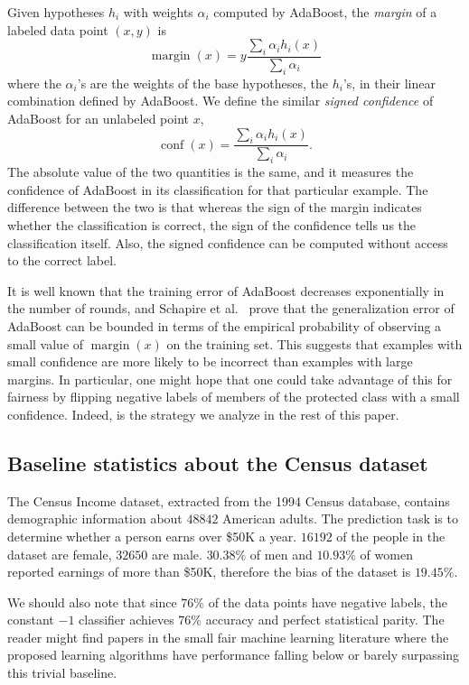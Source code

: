 \documentclass{article}
\DeclareMathOperator{\margin}{margin}
\DeclareMathOperator{\conf}{conf}
\begin{document}
Given hypotheses $h_i$ with weights $\alpha_i$ computed by AdaBoost, the
\emph{margin} of a labeled data point $(x,y)$ is
$$ \margin(x) = y\frac{\sum_i \alpha_i h_i(x)}{\sum_i \alpha_i}$$
where the $\alpha_i$'s are the weights of the base hypotheses, the $h_i$'s,
in their linear combination defined by AdaBoost.
We define the similar \emph{signed confidence} of AdaBoost for an unlabeled point $x$,
$$ \conf(x) = \frac{\sum_i \alpha_i h_i(x)}{\sum_i \alpha_i}.$$
The absolute value of the two quantities is the same, and it measures the confidence
of AdaBoost in its classification for that particular example.
The difference between the two is that whereas the sign of the margin indicates
whether the classification is correct, the sign of the confidence
tells us the classification itself. Also, the signed confidence can be computed
without access to the correct label.

It is well known that
the training error of AdaBoost decreases exponentially in the number of rounds,
and Schapire et al.~\citep{SchapireFBL98} prove that the generalization error
of AdaBoost can be bounded in terms of the empirical probability of observing a
small value of $\margin(x)$ on the training set. This
suggests that examples with small confidence are more likely to be incorrect than
examples with large margins. In particular, one might hope that one could take
advantage of this for fairness by flipping negative labels of members of the
protected class with a small confidence. Indeed, is the strategy we analyze in the
rest of this paper.

\subsection{Baseline statistics about the Census dataset}

The Census Income dataset, extracted from the 1994 Census database, contains
demographic information about $48842$ American adults.  The prediction task is
to determine whether a person earns over \$50K a year. $16192$ of the people in
the dataset are female, $32650$ are male. $30.38\%$ of men and $10.93\%$ of
women reported earnings of more than \$50K, therefore the bias of the dataset
is $19.45\%$.

We should also note that since $76\%$ of the data points have negative labels,
the constant $-1$ classifier achieves $76\%$ accuracy and perfect statistical parity.
The reader might find papers in the small fair machine learning literature
where the proposed learning algorithms have performance falling below or
barely surpassing this trivial baseline.
\end{document}
